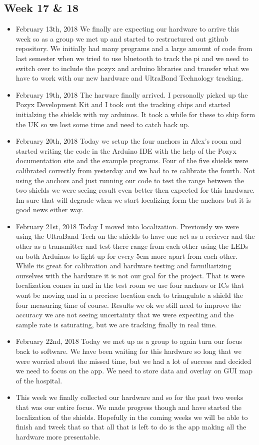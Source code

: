 \documentclass[12pt]{article}
\begin{document}
	\subsection{Week 17 \& 18}
		\begin{itemize}
			\item February 13th, 2018 We finally are expecting our hardware to arrive this week so as a group we met up and started to restructured out github repository. We initially had many programs and a large amount of code from last semester when we tried to use bluetooth to track the pi and we need to switch over to include the pozyx and arduino libraries and transfer what we have to work with our new hardware and UltraBand Technology tracking.
			\item February 19th, 2018 The harware finally arrived. I personally picked up the Pozyx Development Kit and I took out the tracking chips and started initialzing the shields with my arduinos. It took a while for these to ship form the UK so we lost some time and need to catch back up.
			\item February 20th, 2018 Today we setup the four anchors in Alex's room and started writing the code in the Arduino IDE with the help of the Pozyx documentation site and the example programs. Four of the five shields were calibrated correctly from yesterday and we had to re calibrate the fourth.  Not using the anchors and just running our code to test the range between the two shields we were seeing result even better then expected for this hardware. Im sure that will degrade when we start localizing form the anchors but it is good news either way.
			\item February 21st, 2018 Today I moved into localization. Previously we were using the UltraBand Tech on the shields to have one act as a reciever and the other as a transmitter and test there range from each other using the LEDs on both Arduinos to light up for every 5cm more apart from each other. While its great for calibration and hardware testing and farmiliarizing ourselves with the hardware it is not our goal for the project. That is were localization comes in and in the test room we use four anchors or ICs that wont be moving and in a preciese location each to triangulate a shield the four measuring time of course. Results we ok we still need to improve the accuracy we are not seeing uncertainty that we were expecting and the sample rate is saturating, but we are tracking finally in real time.
			\item February 22nd, 2018 Today we met up as a group to again turn our focus back to software. We have been waiting for this hardware so long that we were worried about the missed time, but we had a lot of success and decided we need to focus on the app. We need to store data and overlay on GUI map of the hospital.
			\item This week we finally collected our hardware and so for the past two weeks that was our entire focus. We made progress though and have started the localization of the shields. Hopefully in the coming weeks we will be able to finish and tweek that so that all that is left to do is the app making all the hardware more presentable.
		\end{itemize}
		
\end{document}
